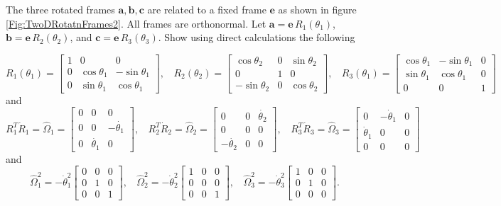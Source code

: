\documentclass[graybox,envcountchap,sectrefs]{svmonoMuga}
\begin{document}
\begin{exercise}\label{ex:RotatedFrames}

The three rotated frames $\mathbf{a},\mathbf{b},\mathbf{c}$ are related to a fixed frame $\mathbf{e}$ as shown in figure \ref{Fig:TwoDRotatnFrames2}. All frames are orthonormal. Let $\mathbf{a}=\mathbf{e}\, R_1{(\theta_1)}$, $\mathbf{b}=\mathbf{e} \,R_2{(\theta_2)}$,
and $\mathbf{c}=\mathbf{e}\, R_3{(\theta_3)}$. Show using direct calculations the following

\[
R_1{(\theta_1)}=\left[\begin{array}{ccc}
1 & 0 & 0\\
0 & \cos{\theta_1} & -\sin{\theta_1}\\
0 & \sin{\theta_1} & \cos{\theta_1}
\end{array}\right],\:\:\:\:
R_2{(\theta_2)}=\left[\begin{array}{ccc}
\cos{\theta_2} & 0 & \sin{\theta_2}\\
0 & 1 & 0\\
- \sin{\theta_2}& 0 & \cos{\theta_2}
\end{array}\right],\:\:\:\:
R_3{(\theta_1)}=\left[\begin{array}{ccc}
\cos{\theta_1} & -\sin{\theta_1} & 0\\
\sin{\theta_1} & \cos{\theta_1} &0\\
0 & 0 & 1
\end{array}\right]
\]
and
\[
R_1^T\dot{R}_1=\widehat{\Omega}_1=\left[\begin{array}{ccc}
0 & 0 & 0\\
0 & 0 & -\dot{\theta_1}\\
0 & \dot{\theta_1} & 0
\end{array}\right],\:\:\:\:
R_2^T\dot{R}_2=\widehat{\Omega}_2=\left[\begin{array}{ccc}
0 & 0 & \dot{\theta_2}\\
0 & 0 & 0\\
- \dot{\theta_2}& 0 & 0
\end{array}\right],\:\:\:\:
R_3^T\dot{R}_3=\widehat{\Omega}_3=\left[\begin{array}{ccc}
0 & -\dot{\theta}_1 & 0\\
\dot{\theta}_1 & 0 &0\\
0 & 0 & 0
\end{array}\right]
\]
and
\[
\widehat{\Omega}_1^2=-\dot{\theta}_1^2\left[\begin{array}{ccc}
0 & 0 & 0\\
0 & 1 & 0\\
0 & 0 & 1
\end{array}\right],\:\:\:\:
\widehat{\Omega}_2^2=-\dot{\theta}_2^2\left[\begin{array}{ccc}
1 & 0 & 0\\
0 & 0 & 0\\
0 & 0 & 1
\end{array}\right],\:\:\:\:
\widehat{\Omega}_3^2=-\dot{\theta}_3^2\left[\begin{array}{ccc}
1 & 0 & 0\\
0 & 1 & 0\\
0 & 0 & 0
\end{array}\right].
\]


\end{exercise}
\end{document}
